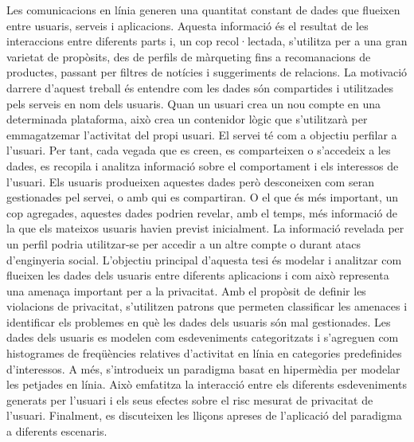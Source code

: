 Les comunicacions en línia generen una quantitat constant de dades que flueixen entre usuaris, serveis i aplicacions. Aquesta informació és el resultat de les interaccions entre diferents parts i, un cop recol·lectada, s'utilitza per a una gran varietat de propòsits, des de perfils de màrqueting fins a recomanacions de productes, passant per filtres de notícies i suggeriments de relacions. La motivació darrere d'aquest treball és entendre com les dades són compartides i utilitzades pels serveis en nom dels usuaris. Quan un usuari crea un nou compte en una determinada plataforma, això crea un contenidor lògic que s'utilitzarà per emmagatzemar l'activitat del propi usuari. El servei té com a objectiu perfilar a l'usuari. Per tant, cada vegada que es creen, es comparteixen o s'accedeix a les dades, es recopila i analitza informació sobre el comportament i els interessos de l'usuari. Els usuaris produeixen aquestes dades però desconeixen com seran gestionades pel servei, o amb qui es compartiran. O el que és més important, un cop agregades, aquestes dades podrien revelar, amb el temps, més informació de la que els mateixos usuaris havien previst inicialment. La informació revelada per un perfil podria utilitzar-se per accedir a un altre compte o durant atacs d'enginyeria social. L'objectiu principal d'aquesta tesi és modelar i analitzar com flueixen les dades dels usuaris entre diferents aplicacions i com això representa una amenaça important per a la privacitat. Amb el propòsit de definir les violacions de privacitat, s'utilitzen patrons que permeten classificar les amenaces i identificar els problemes en què les dades dels usuaris són mal gestionades. Les dades dels usuaris es modelen com esdeveniments categoritzats i s'agreguen com histogrames de freqüències relatives d'activitat en línia en categories predefinides d'interessos. A més, s'introdueix un paradigma basat en hipermèdia per modelar les petjades en línia. Això emfatitza la interacció entre els diferents esdeveniments generats per l'usuari i els seus efectes sobre el risc mesurat de privacitat de l'usuari. Finalment, es discuteixen les lliçons apreses de l'aplicació del paradigma a diferents escenaris.